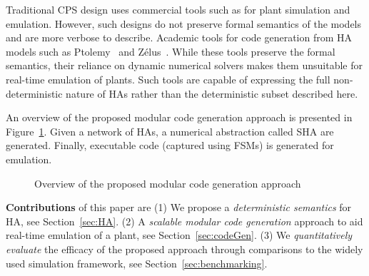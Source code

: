 Traditional \ac{CPS} design uses commercial tools such as \simulink for plant simulation and emulation.
However, such designs do not preserve formal semantics of the models and are more verbose to describe.
Academic tools for code generation from \ac{HA} models such as Ptolemy~\cite{ptolemaeus2014system} and Z\'{e}lus~\cite{bourke13zelus}.
While these tools preserve the formal semantics, their reliance on dynamic numerical solvers makes them unsuitable for real-time emulation of plants.
Such tools are capable of expressing the full non-deterministic nature of \acp{HA} rather than the deterministic subset described here.

   
 An overview of the proposed modular code generation approach is presented
 in Figure~\ref{fig:overview}. Given a network
 of \acp{HA}, a numerical abstraction called \ac{SHA} are generated.
 Finally, executable code (captured using \acp{FSM}) is generated for emulation.
 
 \begin{figure}[bthp]
 	\centering
 	\scalebox{0.7}{
	 
	}
	 \caption{Overview of the proposed modular 
	 	code generation approach \label{fig:overview}}
\end{figure}
      
\textbf{Contributions} of this paper are 
(1) We propose a \emph{deterministic semantics} for \acf{HA}, see Section~\ref{sec:HA}.
(2) A \emph{scalable modular code generation} approach 
to aid real-time emulation of a plant, see Section~\ref{sec:codeGen}.
(3) We \emph{quantitatively evaluate} the efficacy of the 
proposed approach through comparisons  
to the widely used \simulink
simulation framework, see Section~\ref{sec:benchmarking}.
 
